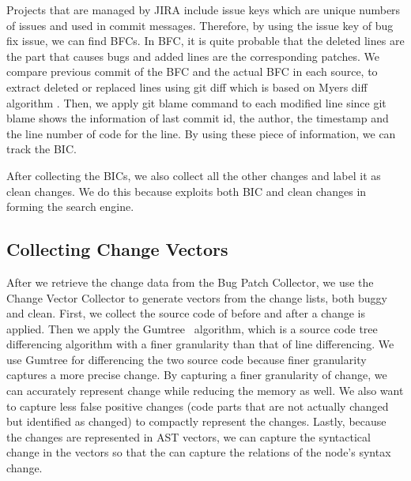     Projects that are managed by JIRA include issue keys which are unique numbers of issues and used in commit messages.
    Therefore, by using the issue key of bug fix issue, we can find BFCs.
    In BFC, it is quite probable that the deleted lines are the part that causes bugs and added lines are the corresponding patches.
    We compare previous commit of the BFC and the actual BFC in each source, to extract deleted or replaced lines using git diff which is based on Myers diff algorithm \cite{myers1986ano}.
    Then, we apply git blame command to each modified line since git blame shows the information of last commit id, the author, the timestamp and the line number of code for the line.
    By using these piece of information, we can track the BIC.
    
    After collecting the BICs, we also collect all the other changes and label it as clean changes.
    We do this because {\simfin} exploits both BIC and clean changes in forming the search engine.
    
    \subsection{Collecting Change Vectors}
    After we retrieve the change data from the Bug Patch Collector, we use the Change Vector Collector to generate vectors from the change lists, both buggy and clean. 
    First, we collect the source code of before and after a change is applied. 
    Then we apply the Gumtree~\cite{falleri2014fine} algorithm, which is a source code tree differencing algorithm with a finer granularity than that of line differencing.
    We use Gumtree for differencing the two source code because finer granularity captures a more precise change.
    By capturing a finer granularity of change, we can accurately represent change while reducing the memory as well.
    We also want to capture less false positive changes (code parts that are not actually changed but identified as changed) to compactly represent the changes.
    Lastly, because the changes are represented in AST vectors, we can capture the syntactical change in the vectors so that the {\simfin} can capture the relations of the node's syntax change.

